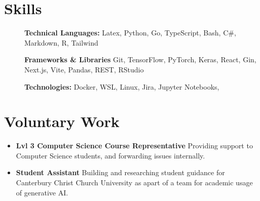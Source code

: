 \documentclass[11pt,letterpaper]{article}
\begin{document}
\section*{Skills}
\begin{description}
  \item[] \textbf{Technical Languages:} Latex, Python, Go, TypeScript, Bash, C\#, Markdown, R, Tailwind
  \item[] \textbf{Frameworks \& Libraries} Git, TensorFlow, PyTorch, Keras, React, Gin, Next.js, Vite, Pandas, REST, RStudio
  \item[] \textbf{Technologies:} Docker, WSL, Linux, Jira, Jupyter Notebooks,
\end{description}

\section*{Voluntary Work}
\begin{itemize}
  \item \textbf{Lvl 3 Computer Science Course Representative} Providing support to Computer Science students, and forwarding issues internally.
  \item \textbf{Student Assistant} Building and researching student guidance for Canterbury Christ Church University as apart of a team for academic usage of generative AI.
\end{itemize}

\vspace{-16.5pt}
\end{document}
